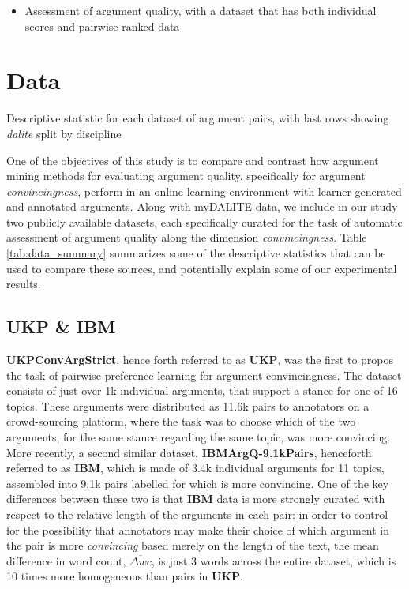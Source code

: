 \documentclass[runningheads]{llncs}
\begin{document}
\begin{itemize}

	\item \cite{toledo_automatic_2019} Assessment of argument quality, with a 
	dataset that has both individual scores 
	and pairwise-ranked data 
	
\end{itemize}
  
\section{Data}

\begin{table}
	\caption{Descriptive statistic for each dataset of argument pairs, with 
		last rows showing \textit{dalite} split by discipline}
	
	\label{tab:data_summary}
\end{table}

One of the objectives of this study is to compare and contrast how argument 
mining methods for evaluating argument quality, specifically for argument 
\textit{convincingness}, perform in an online learning environment with 
learner-generated and annotated arguments. Along with myDALITE data, we include 
in our study two publicly 
available datasets, each specifically curated for the task of automatic 
assessment of argument quality along the dimension \textit{convincingness}. 
Table \ref{tab:data_summary} summarizes some of the descriptive statistics that 
can be used to compare these sources, and potentially explain some of our 
experimental results.

\subsection{UKP \& IBM}
\textbf{UKPConvArgStrict}\cite{habernal_which_2016}, hence forth referred to as 
\textbf{UKP}, was the first to propos the task of pairwise preference learning 
for argument convincingness. The dataset consists of just over 1k individual 
arguments, that support a stance for one of 16 topics. These arguments were 
distributed as 11.6k pairs to annotators on a crowd-sourcing platform, where 
the task was to choose which of the two arguments, for the same stance 
regarding the same topic, was more convincing. More recently, a second similar 
dataset, \textbf{IBMArgQ-9.1kPairs}\cite{toledo_automatic_2019}, henceforth 
referred to as \textbf{IBM}, which is made of 3.4k individual arguments for 11 
topics, assembled into 9.1k pairs labelled for which is more convincing. One of 
the key differences between these two is that \textbf{IBM} data is more 
strongly curated with respect to the relative length of the arguments in each 
pair: in order to control for the possibility that annotators may make their 
choice of which argument in the pair is more \textit{convincing} based merely 
on the length of the text, the mean difference in word count, $\overline{\Delta 
wc}$, is just 3 words across the entire dataset, which is 10 times more 
homogeneous than pairs in \textbf{UKP}.
\end{document}
